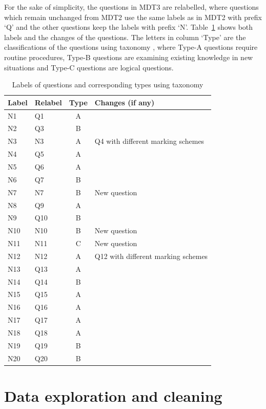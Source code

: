 \documentclass[a4paper]{report}
\begin{document}
For the sake of simplicity, the questions in MDT3 are relabelled, where questions which remain unchanged from MDT2 use the same labels as in MDT2 with prefix `Q' and the other questions keep the labels with prefix `N'. Table~\ref{tab:EDA_groups} shows both labels and the changes of the questions. The letters in column `Type' are the classifications of the questions using taxonomy \cite{taxonomy}, where Type-A questions require routine procedures, Type-B questions are examining existing knowledge in new situations and Type-C questions are logical questions. 

\begin{table}[ht]
  \centering
  \begin{tabular}{llcl}
    \hline
  Label & Relabel & Type & Changes (if any) \\ 
    \hline
    N1 & Q1 & A \\ 
      N2 & Q3 & B \\ 
      N3 & N3 & A & Q4 with different marking schemes\\ 
      N4 & Q5 & A \\ 
      N5 & Q6 & A \\ 
      N6 & Q7 & B \\ 
      N7 & N7 & B & New question \\ 
      N8 & Q9 & A \\ 
      N9 & Q10 & B \\ 
     N10 & N10 & B & New question\\ 
     N11 & N11 & C & New question\\ 
     N12 & N12 & A & Q12 with different marking schemes\\ 
     N13 & Q13 & A \\ 
     N14 & Q14 & B \\ 
     N15 & Q15 & A \\ 
     N16 & Q16 & A \\ 
     N17 & Q17 & A \\ 
     N18 & Q18 & A \\ 
     N19 & Q19 & B \\ 
     N20 & Q20 & B \\ 
     \hline
  \end{tabular}
  \caption{\label{tab:EDA_groups}Labels of questions and corresponding types using taxonomy}
\end{table}

\section{Data exploration and cleaning}
\end{document}
